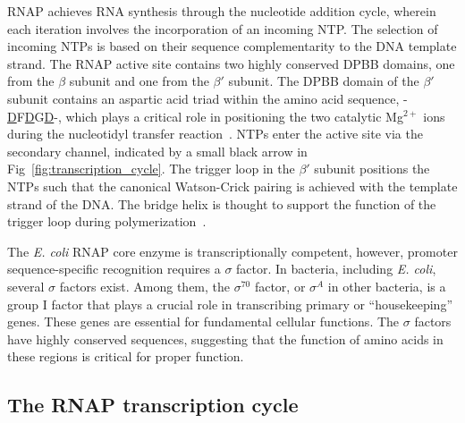 RNAP achieves RNA synthesis through the nucleotide addition cycle, wherein each iteration involves the incorporation of an incoming NTP. 
The selection of incoming NTPs is based on their sequence complementarity to the DNA template strand. 
The RNAP active site contains two highly conserved \ac{DPBB} domains, one from the $\beta$ subunit and one from the $\beta'$ subunit. 
The DPBB domain of the $\beta'$ subunit contains an aspartic acid triad within the amino acid sequence, -\underline{D}F\underline{D}G\underline{D}-, which plays a critical role in positioning the two catalytic Mg$^{2+}$ ions during the nucleotidyl transfer reaction~\cite{murakami_JBC_2013}.
NTPs enter the active site via the secondary channel, indicated by a small black arrow in Fig~\ref{fig:transcription_cycle}. 
The trigger loop in the $\beta'$ subunit positions the NTPs such that the canonical Watson-Crick pairing is achieved with the template strand of the DNA. 
The bridge helix is thought to support the function of the trigger loop during polymerization~\cite{murakami_JBC_2013}.

The \textit{\ac{E. coli}} RNAP core enzyme is transcriptionally competent, however, promoter sequence-specific recognition requires a $\sigma$ factor.
In bacteria, including \textit{\ac{E. coli}}, several $\sigma$ factors exist. 
Among them, the $\sigma^{70}$ factor, or $\sigma^A$ in other bacteria, is a group I factor that plays a crucial role in transcribing primary or \enquote{housekeeping} genes. 
These genes are essential for fundamental cellular functions.
The $\sigma$ factors have highly conserved sequences, suggesting that the function of amino acids in these regions is critical for proper function.

\subsection{The RNAP transcription cycle}
\label{sec:RNAP_cycle}


